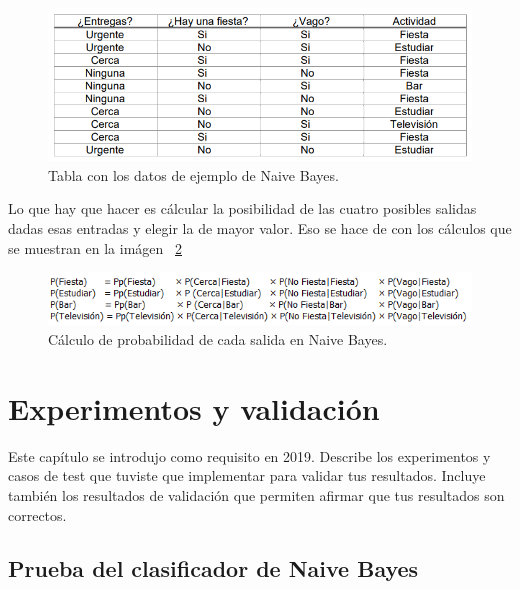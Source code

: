 \documentclass[a4paper, 12pt]{book}
\begin{document}
\begin{figure}
	\centering
	\includegraphics[width=12cm, keepaspectratio]{img/tablabayes}
	\caption{Tabla con los datos de ejemplo de Naive Bayes.}			
	\label{fig:tablabayes}
\end{figure}

Lo que hay que hacer es cálcular la posibilidad de las cuatro posibles salidas dadas esas entradas y elegir la de mayor valor. Eso se hace de con los cálculos que se muestran en la imágen ~\ref{fig:probabilidadbayes}

\begin{figure}
	\centering
	\includegraphics[width=12cm, keepaspectratio]{img/probabilidadbayes}
	\caption{Cálculo de probabilidad de cada salida en Naive Bayes.}			
	\label{fig:probabilidadbayes}
\end{figure}


\cleardoublepage
\chapter{Experimentos y validación}

Este capítulo se introdujo como requisito en 2019. 
Describe los experimentos y casos de test que tuviste que implementar para validar tus resultados. 
Incluye también los resultados de validación que permiten afirmar que tus resultados son correctos. 

\section{Prueba del clasificador de Naive Bayes} 
\label{sec:pruebabayes}
\end{document}
